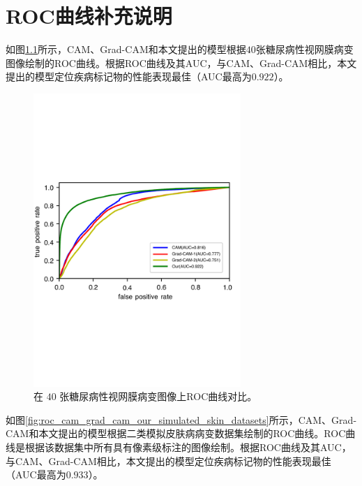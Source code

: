 \chapter{ROC曲线补充说明}\label{chapter:append1}
如图\ref{fig:roc_cam_grad_cam_our_diabetic_retinopathy}所示，CAM、Grad-CAM和本文提出的模型根据$40$张糖尿病性视网膜病变图像绘制的ROC曲线。根据ROC曲线及其AUC，与CAM、Grad-CAM相比，本文提出的模型定位疾病标记物的性能表现最佳（AUC最高为$0.922$）。
\begin{figure}[H]
	\centering
	\includegraphics[width=0.7\textwidth]{figure/ROC_cam_grad_cam_our_diabetic_retinopathy.pdf}
	\caption[在$40$张糖尿病性视网膜病变图像上ROC曲线对比]{在 $40$ 张糖尿病性视网膜病变图像上ROC曲线对比。}
	\label{fig:roc_cam_grad_cam_our_diabetic_retinopathy}
\end{figure}


如图\ref{fig:roc_cam_grad_cam_our_simulated_skin_datasets}所示，CAM、Grad-CAM和本文提出的模型根据二类模拟皮肤病病变数据集绘制的ROC曲线。ROC曲线是根据该数据集中所有具有像素级标注的图像绘制。根据ROC曲线及其AUC，与CAM、Grad-CAM相比，本文提出的模型定位疾病标记物的性能表现最佳（AUC最高为$0.933$）。


